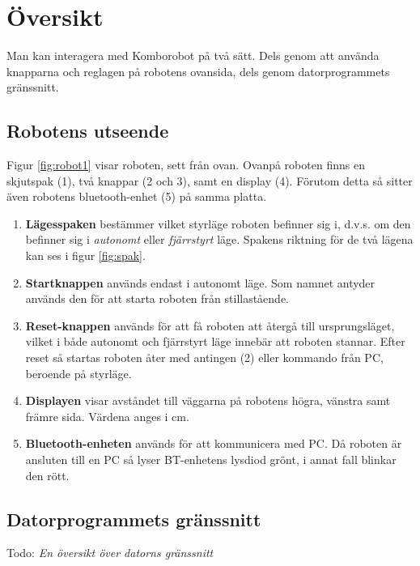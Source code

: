 
%
%


\section{Översikt}

Man kan interagera med Komborobot på två sätt. Dels genom att använda knapparna och reglagen på robotens ovansida, dels genom datorprogrammets gränssnitt. 

\subsection{Robotens utseende}

Figur \ref{fig:robot1} visar roboten, sett från ovan. Ovanpå roboten finns en skjutspak (1), två knappar (2 och 3),  samt en display (4).   Förutom detta så sitter även robotens bluetooth-enhet (5) på samma platta. 


\begin{enumerate}
\item{\bf Lägesspaken} bestämmer vilket styrläge roboten befinner sig i, d.v.s. om den befinner sig i \emph{autonomt} eller \emph{fjärrstyrt} läge. Spakens riktning för de två lägena kan ses i figur \ref{fig:spak}.
\item {\bf Startknappen} används endast i autonomt läge. Som namnet antyder används den för att starta roboten från stillastående. 
\item{\bf Reset-knappen} används för att få roboten att återgå till ursprungsläget, vilket i både autonomt och fjärrstyrt läge innebär att roboten stannar. Efter reset så startas roboten åter med antingen (2) eller kommando från PC, beroende på styrläge.
\item{\bf Displayen} visar avståndet till väggarna på robotens högra, vänstra samt främre sida. Värdena anges i cm. 
\item{\bf Bluetooth-enheten} används för att kommunicera med PC. Då roboten är ansluten till en PC så lyser BT-enhetens lysdiod grönt, i annat fall blinkar den rött. 
\end{enumerate}


\subsection{Datorprogrammets gränssnitt}

Todo: \emph{En översikt över datorns gränssnitt}